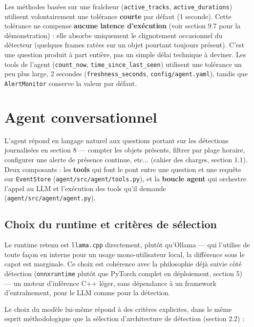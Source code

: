\documentclass[11pt,a4paper]{article}
\let\Oldsubsection\subsection
\renewcommand{\subsection}{\FloatBarrier\Oldsubsection}
\begin{document}
    Les méthodes basées sur une fraîcheur (\texttt{active\_tracks},
    \texttt{active\_durations}) utilisent volontairement une tolérance
    \textbf{courte} par défaut (1 seconde). Cette tolérance ne compense
    \textbf{aucune latence d'exécution} (voir section 9.7 pour la
    démonstration) : elle absorbe uniquement le clignotement occasionnel du
    détecteur (quelques frames ratées sur un objet pourtant toujours
    présent). C'est une question produit à part entière, pas un simple
    délai technique à deviner. Les tools de l'agent (\texttt{count\_now},
    \texttt{time\_since\_last\_seen}) utilisent une tolérance un peu plus
    large, 2 secondes (\texttt{freshness\_seconds},
    \texttt{config/agent.yaml}), tandis que \texttt{AlertMonitor} conserve
    la valeur par défaut.

    \section{Agent conversationnel}
    
    L'agent répond en langage naturel aux questions portant sur les
    détections journalisées en section 8 --- compter les objets présents,
    filtrer par plage horaire, configurer une alerte de présence continue, etc...
    (cahier des charges, section 1.1). Deux composants : les \textbf{tools}
    qui font le pont entre une question et une requête sur
    \texttt{EventStore} (\texttt{agent/src/agent/tools.py}), et la
    \textbf{boucle agent} qui orchestre l'appel au LLM et l'exécution des
    tools qu'il demande (\texttt{agent/src/agent/agent.py}).
    
    \subsection{Choix du runtime et critères de sélection}
    
    Le runtime retenu est \texttt{llama.cpp} directement, plutôt
    qu'Ollama --- qui l'utilise de toute façon en interne pour un usage
    mono-utilisateur local, la différence sous le capot est marginale. Ce choix est cohérence avec la philosophie déjà suivie côté
    détection (\texttt{onnxruntime} plutôt que PyTorch complet en
    déploiement, section 5) --- un moteur d'inférence C++ léger, sans
    dépendance à un framework d'entraînement, pour le LLM comme pour la
    détection.
    
    Le choix du modèle lui-même répond à des critères explicites, dans le
    même esprit méthodologique que la sélection d'architecture de
    détection (section 2.2) :
    
\end{document}

